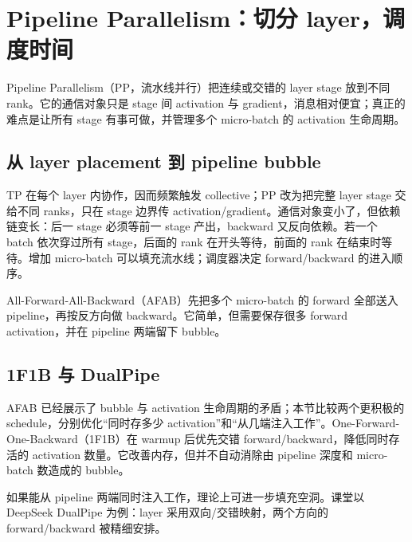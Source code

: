 \section{Pipeline Parallelism：切分 layer，调度时间}

Pipeline Parallelism（PP，流水线并行）把连续或交错的 layer stage 放到不同 rank。它的通信对象只是 stage 间 activation 与 gradient，消息相对便宜；真正的难点是让所有 stage 有事可做，并管理多个 micro-batch 的 activation 生命周期。

\subsection{从 layer placement 到 pipeline bubble}

TP 在每个 layer 内协作，因而频繁触发 collective；PP 改为把完整 layer stage 交给不同 ranks，只在 stage 边界传 activation/gradient。通信对象变小了，但依赖链变长：后一 stage 必须等前一 stage 产出，backward 又反向依赖。若一个 batch 依次穿过所有 stage，后面的 rank 在开头等待，前面的 rank 在结束时等待。增加 micro-batch 可以填充流水线；调度器决定 forward/backward 的进入顺序。


All-Forward-All-Backward（AFAB）先把多个 micro-batch 的 forward 全部送入 pipeline，再按反方向做 backward。它简单，但需要保存很多 forward activation，并在 pipeline 两端留下 bubble。



\subsection{1F1B 与 DualPipe}

AFAB 已经展示了 bubble 与 activation 生命周期的矛盾；本节比较两个更积极的 schedule，分别优化“同时存多少 activation”和“从几端注入工作”。One-Forward-One-Backward（1F1B）在 warmup 后优先交错 forward/backward，降低同时存活的 activation 数量。它改善内存，但并不自动消除由 pipeline 深度和 micro-batch 数造成的 bubble。


如果能从 pipeline 两端同时注入工作，理论上可进一步填充空洞。课堂以 DeepSeek DualPipe 为例：layer 采用双向/交错映射，两个方向的 forward/backward 被精细安排。

